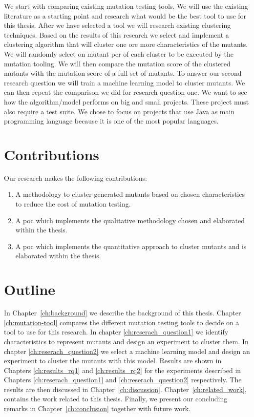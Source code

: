 \documentclass[../main]{subfiles}
\begin{document}
We start with comparing existing mutation testing tools. 
We will use the existing literature as a starting point and research what would be the best tool to use for this thesis.
\newline
After we have selected a tool we will research existing clustering techniques.
Based on the results of this research we select and implement a clustering algorithm that will cluster one ore more characteristics of the mutants. 
We will randomly select on mutant per of each cluster to be executed by the mutation tooling.
We will then compare the mutation score of the clustered mutants with the mutation score of a full set of mutants.
\newline
To answer our second research question we will train a machine learning model to cluster mutants.
We can then repeat the comparison we did for research question one. 
\newline
We want to see how the algorithm/model performs on big and small projects.
These project must also require a test suite.
\newline
We chose to focus on projects that use Java as main programming language because it is one of the most popular languages\cite{Tiobe}.

\section{Contributions}
Our research makes the following contributions:
\begin{enumerate}
 \item A methodology to cluster generated mutants based on chosen characteristics to reduce the cost of mutation testing.
 \item A \acrfull{poc} which implements the qualitative methodology chosen and elaborated within the thesis.
 \item A \acrfull{poc} which implements the quantitative approach to cluster mutants and is elaborated within the thesis. 
\end{enumerate}

\section{Outline}
In Chapter~\ref{ch:background} we describe the background of this thesis. 
Chapter \ref{ch:mutation-tool} compares the different mutation testing tools to decide on a tool to use for this research.
In chapter \ref{ch:reserach_question1} we identify characteristics to represent mutants and design an experiment to cluster them.
In chapter \ref{ch:reserach_question2} we select a machine learning model and design an experiment to cluster the mutants with this model.
Results are shown in Chapters \ref{ch:results_rq1} and \ref{ch:results_rq2} for the experiments described in Chapters \ref{ch:reserach_question1} and \ref{ch:reserach_question2} respectively. 
The results are then discussed in Chapter~\ref{ch:discussion}.
\newline
Chapter~\ref{ch:related_work}, contains the work related to this thesis.
Finally, we present our concluding remarks in Chapter~\ref{ch:conclusion} together with future work.
\end{document}
